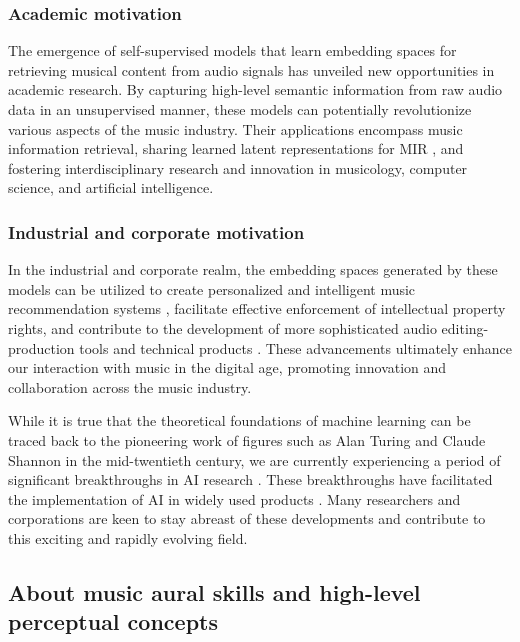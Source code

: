 \subsubsection{Academic motivation}

The emergence of self-supervised models that learn embedding spaces for retrieving musical content from audio signals has unveiled new opportunities in academic research. By capturing high-level semantic information from raw audio data in an unsupervised manner, these models can potentially revolutionize various aspects of the music industry. Their applications encompass music information retrieval, sharing learned latent representations for MIR \cite{HamelTransferSimilarity}, and fostering interdisciplinary research and innovation in musicology, computer science, and artificial intelligence.

\subsubsection{Industrial and corporate motivation}

In the industrial and corporate realm, the embedding spaces generated by these models can be utilized to create personalized and intelligent music recommendation systems \cite{Chen2020LearningRecommendation}\cite{epidemic}, facilitate effective enforcement of intellectual property rights, and contribute to the development of more sophisticated audio editing-production tools and technical products \cite{WonEmotionStories}. These advancements ultimately enhance our interaction with music in the digital age, promoting innovation and collaboration across the music industry.

While it is true that the theoretical foundations of machine learning can be traced back to the pioneering work of figures such as Alan Turing and Claude Shannon in the mid-twentieth century, we are currently experiencing a period of significant breakthroughs in AI research \cite{Vaswani2017AttentionNeed}. These breakthroughs have facilitated the implementation of AI in widely used products \cite{OpenAI2023GPT-4Report}. Many researchers and corporations are keen to stay abreast of these developments and contribute to this exciting and rapidly evolving field.

\subsection{About music aural skills and high-level perceptual concepts}

